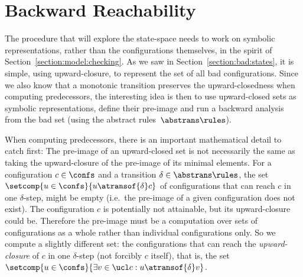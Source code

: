 \section{Backward Reachability}
%


The procedure that will explore the state-space needs to work on
symbolic representations, rather than the configurations themselves,
in the spirit of Section~\ref{section:model:checking}. %
%
As we saw in Section~\ref{section:bad:states}, it is simple, using
upward-closure, to represent the set of all bad configurations.
%
Since we also know that a monotonic transition preserves the
upward-closedness when computing predecessors, the interesting idea is
then to use upward-closed sets as symbolic representations, define
their pre-image and run a backward analysis from the bad set (using
the abstract rules~$\abstrans\rules$). %

\begin{wrapfigure}{r}[0pt]{0.35\textwidth}
  \hfill%
\end{wrapfigure}
%
%
%
When computing predecessors, there is an important mathematical detail
to catch first: The pre-image of an upward-closed set is not
necessarily the same as taking the upward-closure of the pre-image of
its minimal elements.
%
For a configuration $c\in\confs$ and a transition
$\delta\in\abstrans\rules$, %
the set $\setcomp{u\in\confs}{u \atransof{\delta} c}$ of
configurations that can reach $c$ in one \mbox{$\delta$-step}, might
be empty (i.e.\ the pre-image of a given configuration does not
exist).
%
The configuration $c$ is potentially not attainable, but its
upward-closure could be.
%
Therefore the pre-image must be a computation over sets of
configurations as a whole rather than individual configurations only.
%
So we compute a slightly different set: the configurations that can
reach the \emph{upward-closure} of $c$ in one \mbox{$\delta$-step}
(not forcibly $c$ itself), that is, the set %
$\setcomp{u\in\confs}{\exists v\in\ucl c : u
  \atransof{\delta}v}$.

